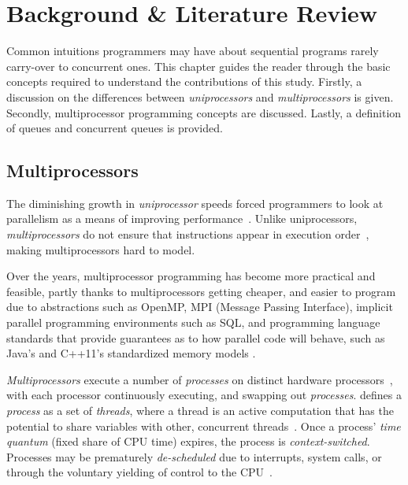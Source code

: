 \chapter{Background \& Literature Review}
Common intuitions programmers may have about sequential programs rarely
carry-over to concurrent ones. This chapter guides the reader through the basic
concepts required to understand the contributions of this study. 
Firstly, a discussion on the differences between \emph{uniprocessors} and
\emph{multiprocessors} is given. Secondly, multiprocessor programming concepts
are discussed. Lastly, a definition of queues and concurrent queues is provided.

\section{Multiprocessors}
The diminishing growth in \emph{uniprocessor} speeds
forced programmers to look at parallelism as a means of improving
performance~\citep{cantrill2008real}. Unlike uniprocessors, \emph{multiprocessors} do
not ensure that instructions appear in execution order~\cite{scott2013shared},
making multiprocessors hard to model.


Over the years, multiprocessor programming has become more practical and
feasible, partly thanks to multiprocessors getting cheaper, and
easier to program due to abstractions such as OpenMP, MPI (Message Passing
Interface), implicit parallel programming environments such as SQL, and
programming language standards that provide guarantees as to how parallel code will
behave, such as Java's\citep{javamemorymodel2014} and C++11's
\citep{cppmemorymodel} standardized memory models
\citep[Chapter~2.2]{perfbook2021}.

\emph{Multiprocessors} execute a number of \emph{processes} on distinct
hardware processors~\citep[Appendix~B.2]{herlihy2020art}, with each processor
continuously executing, and swapping out \emph{processes}.
\citeauthor{scott2013shared} defines a \emph{process} as a set of
\emph{threads}, where a thread is an active computation that has the potential
to share variables with other, concurrent threads~\citep[p.6]{scott2013shared}.
Once a process' \emph{time quantum} (fixed share of CPU time) expires, the
process is \emph{context-switched}. Processes
may be prematurely \emph{de-scheduled} due to interrupts,
system calls, or through the voluntary yielding of control to the CPU~\citep[Section~3.2.3]{osconcepts2021}.

